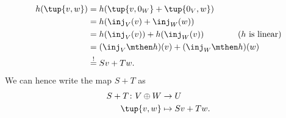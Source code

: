 \begin{example}
    \begin{equation}
        \begin{aligned}
            h(\tup{v,w}) & =h(\tup{v,0_W}+\tup{0_V,w}) \\
                         & =h(\inj_V(v)+\inj_W(w)) \\
                         & =h(\inj_V(v))+h(\inj_W(v)) \qquad \qquad (h \text{ is linear}) \\
                         & =(\inj_V\mthen h)(v)+(\inj_W\mthen h)(w) \\
                         & \overset{!
            }{=}
            Sv+Tw.
        \end{aligned}
    \end{equation}
    We can hence write the map $S+T$ as
    \begin{equation}
        \begin{aligned}
            S+T\colon V\oplus W & \to U \\
            \tup{v,w}           & \mapsto Sv+Tw.
        \end{aligned}
    \end{equation}
\end{example}

